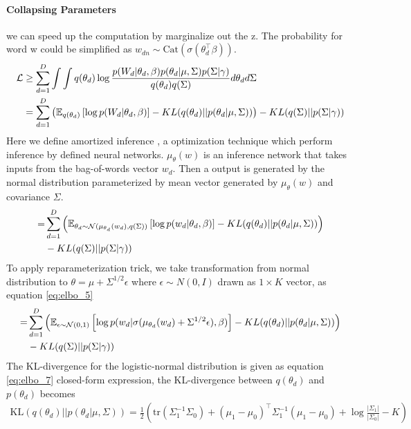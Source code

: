 \paragraph{Collapsing Parameters} we can speed up the computation by marginalize out the z. The probability for word w could be simplified as $ w_{dn}\sim\text{Cat}(\sigma(\theta^\top_{d}\beta)) $.
\begin{align}\label{eq:elbo_3}
\mathcal{L}&\geq\sum_{d=1}^{D}\int\int q(\theta_d)\log\frac{p(W_d|\theta_d,\beta)p(\theta_d|\mu,\Sigma)p(\Sigma|\gamma)}{q(\theta_d)q(\Sigma)}d\theta_d d\Sigma\notag\\
&=\sum_{d=1}^{D}\left(\mathbb{E}_{q(\theta_d)}\left[\log p(W_d|\theta_d,\beta)\right]-KL(q(\theta_d)||p(\theta_d|\mu,\Sigma))\right)-KL(q(\Sigma)||p(\Sigma|\gamma))
\end{align}
Here we define amortized inference \cite{kingma_auto-encoding_2014}, a optimization technique which perform inference by defined neural networks. $ \mu_\theta(w) $ is an inference network that takes inputs from the bag-of-words vector $ w_d $. Then a output is generated by the normal distribution parameterized by mean vector generated by  $ \mu_\theta(w) $ and covariance $ \Sigma $.
\begin{align}\label{eq:elbo_4}
=&\sum_{d=1}^{D}\left(\mathbb{E}_{\theta_d\sim\mathcal{N}(\mu_{\theta_d}(w_d), q(\Sigma))}\left[\log p(w_d|\theta_d,\beta)\right]-KL(q(\theta_d)||p(\theta_d|\mu,\Sigma))\right)\notag\\
&-KL(q(\Sigma)||p(\Sigma|\gamma))
\end{align}
To apply reparameterization trick, we take transformation from normal distribution to $ \theta=\mu+\Sigma^{1/2}\epsilon $ where $ \epsilon\sim N(0,I) $ drawn as $ 1\times K $ vector, as equation \ref{eq:elbo_5}
\begin{align}\label{eq:elbo_5}
=&\sum_{d=1}^{D}\left(\mathbb{E}_{\epsilon\sim\mathcal{N}(0,1)}\left[\log p(w_d|\sigma(\mu_{\theta_d}(w_d)+\Sigma^{1/2}\epsilon),\beta)\right]-KL(q(\theta_d)||p(\theta_d|\mu,\Sigma))\right)\notag\\
&-KL(q(\Sigma)||p(\Sigma|\gamma))
\end{align}
The KL-divergence for the logistic-normal distribution is given as equation \ref{eq:elbo_7} closed-form expression, the KL-divergence between $ q(\theta_d) $ and $ p(\theta_d) $ becomes
\begin{align}\label{eq:elbo_7}
\text{KL}(q(\theta_d)||p(\theta_d|\mu,\Sigma))=\frac{1}{2}\left(\text{tr}(\Sigma_1^{-1}\Sigma_0)+(\mu_1-\mu_0)^\top\Sigma_1^{-1}(\mu_1-\mu_0)+\log\frac{|\Sigma_1|}{|\Sigma_0|}-K\right)
\end{align}
